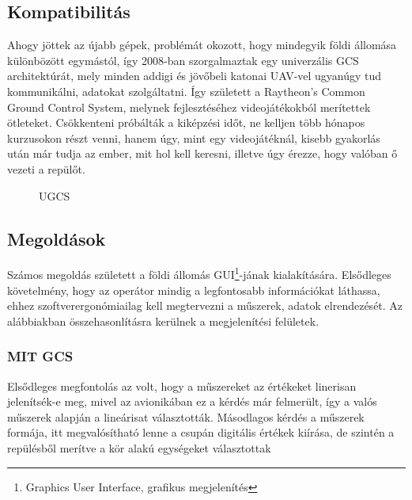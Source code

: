 \documentclass[12pt]{article}
\begin{document}
\begin{itemize}
\subsection{Kompatibilitás}
\cite{bib:komp}Ahogy jöttek az újabb gépek, problémát okozott, hogy mindegyik földi állomása különbözött egymástól, így 2008-ban szorgalmaztak egy univerzális GCS architektúrát, mely minden addigi és jöv\H{o}beli katonai UAV-vel ugyanúgy tud kommunikálni, adatokat szolgáltatni. Így született a Raytheon’s Common Ground Control System, melynek fejlesztéséhez videojátékokból merítettek ötleteket. Csökkenteni próbálták a kiképzési id\H{o}t, ne kelljen több hónapos kurzusokon részt venni, hanem úgy, mint egy videojátéknál, kisebb gyakorlás után már tudja az ember, mit hol kell keresni, illetve úgy érezze, hogy valóban \H{o} vezeti a repül\H{o}t.

\begin{figure}[H]
	\centering
	\caption{UGCS}
	\label{fig:kompat}
\end{figure}


\subsection{Megoldások}
Számos megoldás született a földi állomás GUI\footnote{Graphics User Interface, grafikus megjelenítés}-jának kialakítására. Els\H{o}dleges követelmény, hogy az operátor mindig a legfontosabb információkat láthassa, ehhez szoftverergonómiailag kell megtervezni a m\H{u}szerek, adatok elrendezését.
Az alábbiakban összehasonlításra kerülnek a megjelenítési felületek.

\subsubsection{MIT GCS}
\cite{bib:mit}Els\H{o}dleges megfontolás az volt, hogy a m\H{u}szereket az értékeket linerisan jelenítsék-e meg, mivel az avionikában ez a kérdés már felmerült, így a valós m\H{u}szerek alapján a lineárisat választották. Másodlagos kérdés a m\H{u}szerek formája, itt megvalósítható lenne a csupán digitális értékek kiírása, de szintén a repülésb\H{o}l merítve a kör alakú egységeket választottak


\end{itemize}
\end{document}

